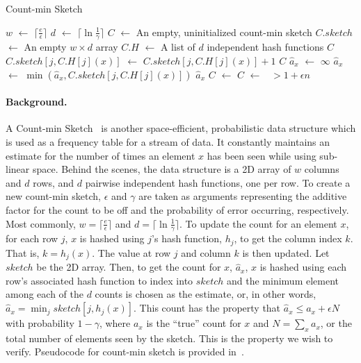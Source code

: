 \documentclass[acmsmall,review,anonymous]{acmart}\settopmatter{printfolios=true,printccs=false,printacmref=false}
\newcommand*\Let[2]{\State #1 $\gets$ #2}
\begin{document}
\begin{algorithm}
  \caption{Count-min Sketch}
  \label{alg:countminsketch}
  \begin{algorithmic}[1]
    \Let{$w$}{$\lceil \frac{e}{\epsilon} \rceil$}
    \Let{$d$}{$\lceil \ln \frac{1}{\gamma} \rceil$}
    \Let{$C$}{An empty, uninitialized count-min sketch}
    \Let{$C.\mathit{sketch}$}{An empty $w \times d$ array}
    \Let{$C.H$}{A list of $d$ independent hash functions}
    \State\Return $C$
    \EndFunction
    \Statex
    \Let{$C.\mathit{sketch}[j,C.H[j](x)]$}{$C.\mathit{sketch}[j,C.H[j](x)] + 1$}
    \EndFor
    \State\Return $C$
    \EndFunction
    \Statex
    \Let{$\hat{a}_x$}{$\infty$}
    \Let{$\hat{a}_x$}{$\min(\hat{a}_x,C.\mathit{sketch}[j,C.H[j](x)])$}
    \EndFor
    \State\Return $\hat{a}_x$
    \EndFunction
    \Statex
     \label{line:countminsketch_main}
    \Let{$C$}{}
    \Let{$C$}{}
    \EndFor
    \State\Return {}~$> 1+\epsilon n$
    \EndFunction
  \end{algorithmic}
\end{algorithm}

\paragraph*{Background.}
A Count-min Sketch~\citep{graham_2005} is another space-efficient, probabilistic data structure which is used as a frequency table for a stream of data.
% 
It constantly maintains an estimate for the number of times an element $x$ has been seen while using sub-linear space.
% 
Behind the scenes, the data structure is a 2D array of $w$ columns and $d$ rows, and $d$ pairwise independent hash functions, one per row.
% 
To create a new count-min sketch, $\epsilon$ and $\gamma$ are taken as arguments representing the additive factor for the count to be off and the probability of error occurring, respectively.
% 
Most commonly, $w = \lceil \frac{e}{\epsilon} \rceil$ and $d = \lceil \ln \frac{1}{\gamma} \rceil$.
% 
To update the count for an element $x$, for each row $j$, $x$ is hashed using $j$'s hash function, $h_j$, to get the column index $k$.
% 
That is, $k = h_j(x)$.
% 
The value at row $j$ and column $k$ is then updated.
% 
Let $\mathit{sketch}$ be the 2D array.
% 
Then, to get the count for $x$, $\hat{a}_x$, $x$ is hashed using each row's associated hash function to index into $\mathit{sketch}$ and the minimum element among each of the $d$ counts is chosen as the estimate, or, in other words, $\hat{a}_x = \min_j \mathit{sketch}[j,h_j(x)]$.
% 
This count has the property that $\hat{a}_x \leq a_x + \epsilon N$ with probability $1-\gamma$, where $a_x$ is the ``true'' count for $x$ and $N = \sum_x a_x$, or the total number of elements seen by the sketch.
% 
This is the property we wish to verify.
% 
Pseudocode for count-min sketch is provided in~.
\end{document}
